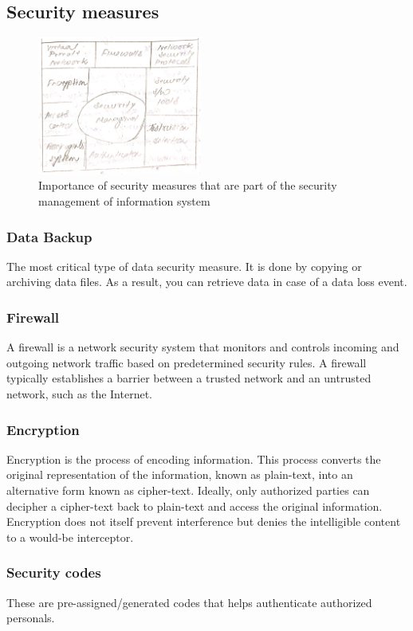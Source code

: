 \documentclass[twocolumn, 12pt, a4paper]{article}
\begin{document}
\subsection{Security measures}
\begin{figure}[h]
  \centering
  \includegraphics[width=0.48\textwidth]{secmeasure}
  \caption{Importance of security measures that are part of the
  security management of information system}
\end{figure}
\subsubsection{Data Backup}
The most critical type of data security measure. It is done by copying or
archiving data files. As a result, you can retrieve data in case of a data loss
event.

\subsubsection{Firewall}
A firewall is a network security system that monitors and controls incoming
and outgoing network traffic based on predetermined security rules. A
firewall typically establishes a barrier between a trusted network and an
untrusted network, such as the Internet.

\subsubsection{Encryption}
Encryption is the process of encoding information. This process converts the
original representation of the information, known as plain-text, into an
alternative form known as cipher-text. Ideally, only authorized parties can
decipher a cipher-text back to plain-text and access the original information.
Encryption does not itself prevent interference but denies the intelligible
content to a would-be interceptor.

\subsubsection{Security codes}
These are pre-assigned/generated codes that helps authenticate authorized 
personals.
\end{document}
